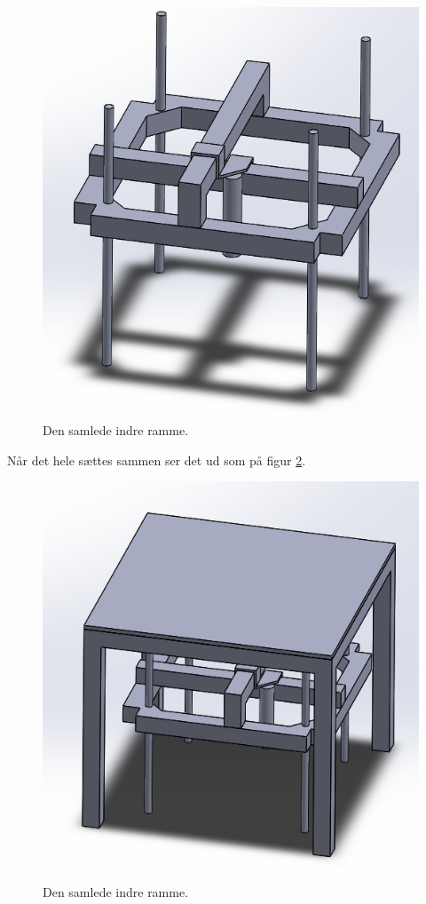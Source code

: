 \begin{figure}[H]
	\centerline{\includegraphics[scale=1]{Konstruktion/Billeder/IR_F}}
	\caption{Den samlede indre ramme.}
	\label{IR_F}
\end{figure}

\noindent
Når det hele sættes sammen ser det ud som på figur \ref{FR}.

\begin{figure}[H]
	\centerline{\includegraphics[scale=1]{Konstruktion/Billeder/fr}}
	\caption{Den samlede indre ramme.}
	\label{FR}
\end{figure}